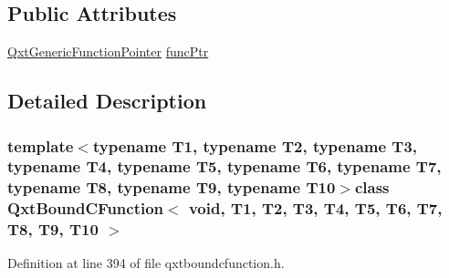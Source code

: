 \subsection*{Public Attributes}
\begin{DoxyCompactItemize}
\item 
\hyperlink{class_qxt_generic_function_pointer}{Qxt\-Generic\-Function\-Pointer} \hyperlink{class_qxt_bound_c_function_3_01void_00_01_t1_00_01_t2_00_01_t3_00_01_t4_00_01_t5_00_01_t6_00_01_e4575a50989f1ee70eb922dd1051fedb_a76acac791de5f64aff73dd6877a55316}{func\-Ptr}
\end{DoxyCompactItemize}


\subsection{Detailed Description}
\subsubsection*{template$<$typename T1, typename T2, typename T3, typename T4, typename T5, typename T6, typename T7, typename T8, typename T9, typename T10$>$class Qxt\-Bound\-C\-Function$<$ void, T1, T2, T3, T4, T5, T6, T7, T8, T9, T10 $>$}



Definition at line 394 of file qxtboundcfunction.\-h.



